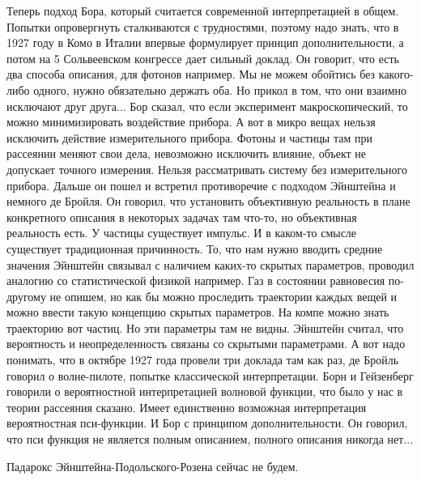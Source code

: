 \documentclass[a4paper, 12pt]{article}
\begin{document}
Теперь подход Бора, который считается современной интерпретацией 
в общем. Попытки опровергнуть сталкиваются с трудностями, поэтому надо 
знать, что в 1927 году в Комо в Италии впервые формулирует принцип 
дополнительности, а потом на 5 Сольвеевском конгрессе дает сильный 
доклад. Он говорит, что есть два способа описания, для фотонов например. 
Мы не можем обойтись без какого-либо одного, нужно обязательно держать 
оба. Но прикол в том, что они взаимно исключают друг друга... Бор 
сказал, что если эксперимент макроскопический, то можно минимизировать 
воздействие прибора. А вот в микро вещах нельзя исключить действие 
измерительного прибора. Фотоны и частицы там при рассеянии меняют свои 
дела, невозможно исключить влияние, объект не допускает точного 
измерения. Нельзя рассматривать систему без измерительного прибора. 
Дальше он пошел и встретил противоречие с подходом Эйнштейна и немного 
де Бройля. Он говорил, что установить объективную реальность в плане 
конкретного описания в некоторых задачах там что-то, но объективная 
реальность есть. У частицы существует импульс. И в каком-то смысле 
существует традиционная причинность. То, что нам нужно вводить средние 
значения Эйнштейн связывал с наличием каких-то скрытых параметров, 
проводил аналогию со статистической физикой например. Газ в состоянии 
равновесия по-другому не опишем, но как бы можно проследить траектории 
каждых вещей и можно ввести такую концепцию скрытых параметров. На компе 
можно знать траекторию вот частиц. Но эти параметры там не видны. 
Эйнштейн считал, что вероятность и неопределенность связаны со скрытыми 
параметрами. А вот надо понимать, что в октябре 1927 года провели три 
доклада там как раз, де Бройль говорил о волне-пилоте, попытке 
классической интерпретации. Борн и Гейзенберг говорили о вероятностной 
интерпретацией волновой функции, что было у нас в теории рассеяния 
сказано. Имеет единственно возможная интерпретация вероятностная 
пси-функции. И Бор с принципом дополнительности. Он говорил, что пси 
функция не является полным описанием, полного описания никогда нет...

Падарокс Эйнштейна-Подольского-Розена сейчас не будем.

\end{document}
